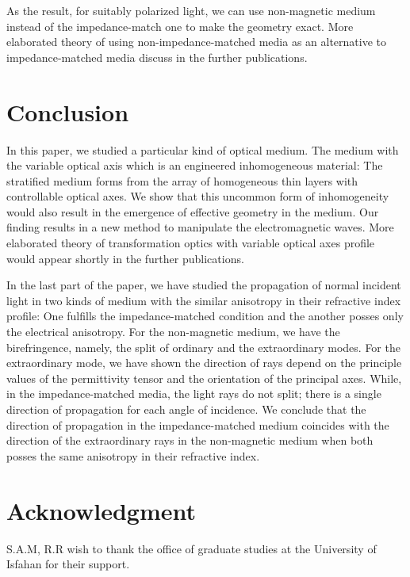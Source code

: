 \documentclass[9pt,twocolumn,twoside]{osajnl}
\begin{document}
 As the result, for suitably polarized light, we can use non-magnetic medium instead of the impedance-match one to make the geometry exact. 
 More elaborated theory of using non-impedance-matched media as an alternative to impedance-matched media discuss in the further publications.
 
\section{Conclusion}\label{conclusion}

In this paper, we studied a particular kind of optical medium. The medium with the variable optical axis which is an engineered inhomogeneous material: The stratified medium forms from the array of homogeneous thin layers with controllable optical axes.  
We show that this uncommon form of inhomogeneity would also result in the emergence of effective geometry in the medium. Our finding results in a new method to manipulate the electromagnetic waves. More elaborated theory of transformation optics with variable optical axes profile would appear shortly in the further publications.

In the last part of the paper, we have studied the propagation of normal incident light in two kinds of medium with the similar anisotropy in their refractive index profile:  One fulfills the impedance-matched condition and the another posses only the electrical anisotropy. 
For the non-magnetic medium, we have the birefringence, namely, the split of ordinary and the extraordinary modes.  For the extraordinary mode, we have shown the direction of rays depend on the principle values of the permittivity tensor and the orientation of the principal axes.
While, in the impedance-matched media, the light rays do not split; there is a single direction of propagation for each angle of incidence.  
We conclude that the direction of propagation in the impedance-matched medium coincides with the direction of the extraordinary rays in the non-magnetic medium when both posses the same anisotropy in their refractive index.





\section*{Acknowledgment}
S.A.M, R.R wish to thank the office of graduate studies at the University of Isfahan for their support.


\end{document}
